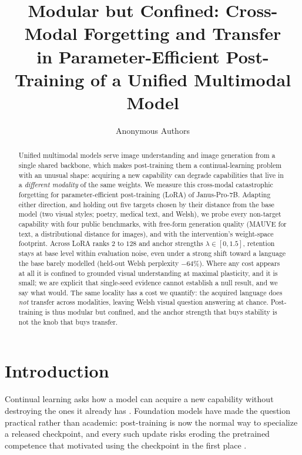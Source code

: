 \documentclass{article}
\title{Modular but Confined: Cross-Modal Forgetting and Transfer\\
in Parameter-Efficient Post-Training of a Unified Multimodal Model}
\author{%
  Anonymous Authors \\
}
\begin{document}
\maketitle

\begin{abstract}
Unified multimodal models serve image understanding and image generation from a
single shared backbone, which makes post-training them a continual-learning
problem with an unusual shape: acquiring a new capability can degrade
capabilities that live in a \emph{different modality} of the same weights. We
measure this cross-modal catastrophic forgetting for parameter-efficient
post-training (LoRA) of Janus-Pro-7B. Adapting either direction, and holding out
five targets chosen by their distance from the base model (two visual styles;
poetry, medical text, and Welsh), we probe every non-target capability with four
public benchmarks, with free-form generation quality (MAUVE for text, a
distributional distance for images), and with the intervention's weight-space
footprint. Across LoRA ranks $2$ to $128$ and anchor strengths
$\lambda\in[0,1.5]$, retention stays at base level within evaluation noise, even
under a strong shift toward a language the base barely modelled (held-out Welsh
perplexity $-64\%$). Where any cost appears at all it is confined to grounded
visual understanding at maximal plasticity, and it is small; we are explicit
that single-seed evidence cannot establish a null result, and we say what would.
The same locality has a cost we quantify:
the acquired language does \emph{not} transfer across modalities, leaving Welsh
visual question answering at chance. Post-training is thus modular but confined,
and the anchor strength that buys stability is not the knob that buys transfer.
\end{abstract}

\section{Introduction}
Continual learning asks how a model can acquire a new capability without
destroying the ones it already has \citep{mccloskey1989catastrophic,
french1999catastrophic}. Foundation models have made the question practical
rather than academic: post-training is now the normal way to specialize a
released checkpoint, and every such update risks eroding the pretrained
competence that motivated using the checkpoint in the first place
\citep{kirkpatrick2017ewc, li2017lwf}.
\end{document}
